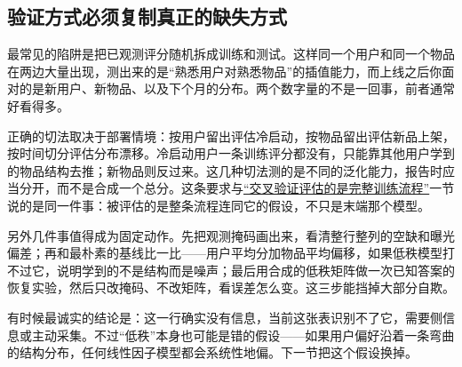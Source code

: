 \subsection{验证方式必须复制真正的缺失方式}

最常见的陷阱是把已观测评分随机拆成训练和测试。这样同一个用户和同一个物品在两边大量出现，测出来的是``熟悉用户对熟悉物品''的插值能力，而上线之后你面对的是新用户、新物品、以及下个月的分布。两个数字量的不是一回事，前者通常好看得多。

正确的切法取决于部署情境：按用户留出评估冷启动，按物品留出评估新品上架，按时间切分评估分布漂移。冷启动用户一条训练评分都没有，只能靠其他用户学到的物品结构去推；新物品则反过来。这几种切法测的是不同的泛化能力，报告时应当分开，而不是合成一个总分。这条要求与\hyperref[sec:11-Mathematical-Statistics/06-Resampling-and-Model-Selection/03]{``交叉验证评估的是完整训练流程''}一节说的是同一件事：被评估的是整条流程连同它的假设，不只是末端那个模型。

另外几件事值得成为固定动作。先把观测掩码画出来，看清整行整列的空缺和曝光偏差；再和最朴素的基线比一比——用户平均分加物品平均偏移，如果低秩模型打不过它，说明学到的不是结构而是噪声；最后用合成的低秩矩阵做一次已知答案的恢复实验，然后只改掩码、不改矩阵，看误差怎么变。这三步能挡掉大部分自欺。

有时候最诚实的结论是：这一行确实没有信息，当前这张表识别不了它，需要侧信息或主动采集。不过``低秩''本身也可能是错的假设——如果用户偏好沿着一条弯曲的结构分布，任何线性因子模型都会系统性地偏。下一节把这个假设换掉。
